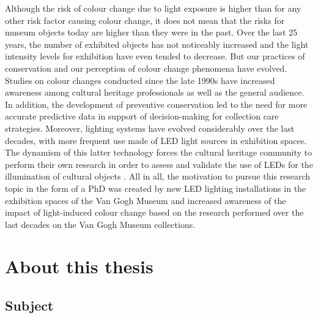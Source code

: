 Although the risk of colour change due to light exposure is higher than for any other risk factor causing colour change, it does not mean that the risks for museum objects today are higher than they were in the past. Over the last 25 years, the number of exhibited objects has not noticeably increased and the light intensity levels for exhibition have even tended to decrease. But our practices of conservation and our perception of colour change phenomena have evolved. Studies on colour changes conducted since the late 1990s have increased awareness among cultural heritage professionals as well as the general audience. In addition, the development of preventive conservation led to the need for more accurate predictive data in support of decision-making for collection care strategies. Moreover, lighting systems have evolved considerably over the last decades, with more frequent use made of \gls{LED} light sources in exhibition spaces. The dynamism of this latter technology forces the cultural heritage community to perform their own research in order to assess and validate the use of LEDs for the illumination of cultural objects \citep{michalski_led_2020}. All in all, the motivation to pursue this research topic in the form of a PhD was created by new \gls{LED} lighting installations in the exhibition spaces of the Van Gogh Museum and increased awareness of the impact of light-induced colour change based on the research performed over the last decades on the Van Gogh Museum collections.\\




\newpage
\section{About this thesis}

\subsection{Subject}


